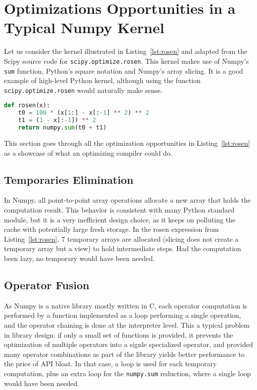 \documentclass[10pt, preprint]{sigplanconf}
\begin{document}
\section{Optimizations Opportunities in a Typical Numpy Kernel}
\label{sec:optimize}

Let us consider the kernel illustrated in Listing~\ref{lst:rosen} and adapted
from the Scipy source code for \texttt{scipy.optimize.rosen}. This kernel makes
use of Numpy's \texttt{sum} function, Python's square notation and Numpy's
array slicing. It is a good example of high-level Python kernel, although
using the function \texttt{scipy.optimize.rosen} would naturally make sense.

\begin{lstlisting}[language=python, caption={High-level implementation of the rosenbrock function in Numpy}, label={lst:rosen}]
def rosen(x):
    t0 = 100 * (x[1:] - x[:-1] ** 2) ** 2
    t1 = (1 - x[:-1]) ** 2
    return numpy.sum(t0 + t1)
\end{lstlisting}

This section goes through all the optimization opportunities in
Listing~\ref{lst:rosen} as a showcase of what an optimizing compiler could do.


\subsection{Temporaries Elimination}
\label{sec:temporaries-elimination}

In Numpy, all point-to-point array operations allocate a new array that holds
the computation result. This behavior is consistent with many Python standard
module, but it is a very inefficient design choice, as it keeps on polluting
the cache with potentially large fresh storage. In the rosen expression from
Listing~\ref{lst:rosen}, 7 temporary arrays are allocated (slicing does not
create a temporary array but a view) to hold intermediate steps. Had the
computation been lazy, no temporary would have been needed.

\subsection{Operator Fusion}
\label{sec:operator-fusion}

As Numpy is a native library mostly written in C, each operator computation is
performed by a function implemented as a loop performing a single operation,
and the operator chaining is done at the interpreter level. This a typical
problem in library design: if only a small set of functions is provided, it
prevents the optimization of multiple operators into a signle specialized
operator, and provided many operator combinations as part of the library yields
better performance to the price of API bloat. In that case, a loop is used for
each temporary computation, plus an extra loop for the \texttt{numpy.sum}
reduction, where a single loop would have been needed.
\end{document}
